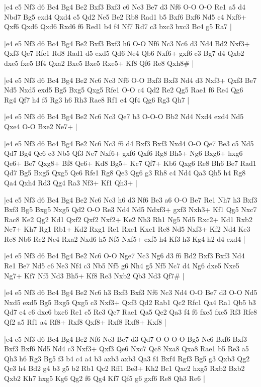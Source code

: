 \whitename{}
\blackname{}
\makegametitle
|e4 e5 Nf3 d6 Bc4 Bg4 Be2 Bxf3 Bxf3 c6 Nc3 Be7 d3 Nf6 O-O O-O Re1 a5 d4 Nbd7 Bg5 exd4 Qxd4 c5 Qd2 Ne5 Be2 Rb8 Rad1 b5 Bxf6 Bxf6 Nd5 c4 Nxf6+ Qxf6 Qxd6 Qxd6 Rxd6 f6 Red1 b4 f4 Nf7 Rd7 c3 bxc3 bxc3 Bc4 g5 Ra7  |

\whitename{}
\blackname{}
\makegametitle
|e4 e5 Nf3 d6 Bc4 Bg4 Be2 Bxf3 Bxf3 h6 O-O Nf6 Nc3 Nc6 d3 Nd4 Bd2 Nxf3+ Qxf3 Qe7 Rfe1 Rd8 Rad1 d5 exd5 Qd6 Ne4 Qb6 Nxf6+ gxf6 c3 Bg7 d4 Qxb2 dxe5 fxe5 Bf4 Qxa2 Bxe5 Bxe5 Rxe5+ Kf8 Qf6 Re8 Qxh8\#  |

\whitename{}
\blackname{}
\makegametitle
|e4 e5 Nf3 d6 Bc4 Bg4 Be2 Nc6 Nc3 Nf6 O-O Bxf3 Bxf3 Nd4 d3 Nxf3+ Qxf3 Be7 Nd5 Nxd5 exd5 Bg5 Bxg5 Qxg5 Rfe1 O-O c4 Qd2 Re2 Qg5 Rae1 f6 Re4 Qg6 Rg4 Qf7 h4 f5 Rg3 h6 Rh3 Rae8 Rf1 e4 Qf4 Qg6 Rg3 Qh7  |

\whitename{}
\blackname{}
\makegametitle
|e4 e5 Nf3 d6 Bc4 Bg4 Be2 Nc6 Nc3 Qe7 b3 O-O-O Bb2 Nd4 Nxd4 exd4 Nd5 Qxe4 O-O Bxe2 Ne7+  |

\whitename{}
\blackname{}
\makegametitle
|e4 e5 Nf3 d6 Bc4 Bg4 Be2 Nc6 Nc3 f6 d4 Bxf3 Bxf3 Nxd4 O-O Qe7 Be3 c5 Nd5 Qd7 Bg4 Qc6 c3 Nb5 Qf3 Ne7 Nxf6+ gxf6 Qxf6 Rg8 Bh5+ Ng6 Bxg6+ hxg6 Qe6+ Be7 Qxg8+ Bf8 Qe6+ Kd8 Bg5+ Kc7 Qf7+ Kb6 Qxg6 Re8 Bh6 Be7 Rad1 Qd7 Bg5 Bxg5 Qxg5 Qe6 Rfe1 Rg8 Qe3 Qg6 g3 Rh8 c4 Nd4 Qa3 Qh5 h4 Rg8 Qa4 Qxh4 Rd3 Qg4 Ra3 Nf3+ Kf1 Qh3+  |

\whitename{}
\blackname{}
\makegametitle
|e4 e5 Nf3 d6 Bc4 Bg4 Be2 Nc6 Nc3 h6 d3 Nf6 Be3 a6 O-O Be7 Re1 Nh7 h3 Bxf3 Bxf3 Bg5 Bxg5 Nxg5 Qd2 O-O Re3 Nd4 Nd5 Ndxf3+ gxf3 Nxh3+ Kf1 Qg5 Nxc7 Rac8 Ke2 Qg2 Kd1 Qxf2 Qxf2 Nxf2+ Ke2 Nh3 Rh1 Ng5 Nd5 Rxc2+ Kd1 Rxb2 Ne7+ Kh7 Rg1 Rb1+ Kd2 Rxg1 Re1 Rxe1 Kxe1 Re8 Nd5 Nxf3+ Kf2 Nd4 Ke3 Rc8 Nb6 Rc2 Nc4 Rxa2 Nxd6 h5 Nf5 Nxf5+ exf5 h4 Kf3 h3 Kg4 h2 d4 exd4  |

\whitename{}
\blackname{}
\makegametitle
|e4 e5 Nf3 d6 Bc4 Bg4 Be2 Nc6 O-O Nge7 Nc3 Ng6 d3 f6 Bd2 Bxf3 Bxf3 Nd4 Re1 Be7 Nd5 c6 Ne3 Nf4 c3 Nb5 Nf5 g6 Nh4 g5 Nf5 Nc7 d4 Ng6 dxe5 Nxe5 Ng7+ Kf7 Nf5 Nd3 Bh5+ Kf8 Re3 Nxb2 Qb3 Nd3 Qf7\#  |

\whitename{}
\blackname{}
\makegametitle
|e4 e5 Nf3 d6 Bc4 Bg4 Be2 Nc6 h3 Bxf3 Bxf3 Nf6 Nc3 Nd4 O-O Be7 d3 O-O Nd5 Nxd5 exd5 Bg5 Bxg5 Qxg5 c3 Nxf3+ Qxf3 Qd2 Rab1 Qc2 Rfc1 Qa4 Ra1 Qb5 b3 Qd7 c4 c6 dxc6 bxc6 Re1 c5 Re3 Qc7 Rae1 Qa5 Qe2 Qa3 f4 f6 fxe5 fxe5 Rf3 Rfe8 Qf2 a5 Rf1 a4 Rf8+ Rxf8 Qxf8+ Rxf8 Rxf8+ Kxf8  |

\whitename{}
\blackname{}
\makegametitle
|e4 e5 Nf3 d6 Bc4 Bg4 Be2 Nf6 Nc3 Be7 d3 Qd7 O-O O-O Bg5 Nc6 Bxf6 Bxf3 Bxf3 Bxf6 Nd5 Nd4 c3 Nxf3+ Qxf3 Qe6 Nxc7 Qc8 Nxa8 Qxa8 Rae1 b5 Re3 a5 Qh3 h6 Rg3 Bg5 f3 b4 c4 a4 b3 axb3 axb3 Qa3 f4 Bxf4 Rgf3 Bg5 g3 Qxb3 Qg2 Qc3 h4 Bd2 g4 b3 g5 b2 Rb1 Qc2 Rff1 Be3+ Kh2 Bc1 Qxc2 hxg5 Rxb2 Bxb2 Qxb2 Kh7 hxg5 Kg6 Qg2 f6 Qg4 Kf7 Qf5 g6 gxf6 Re8 Qh3 Re6  |

